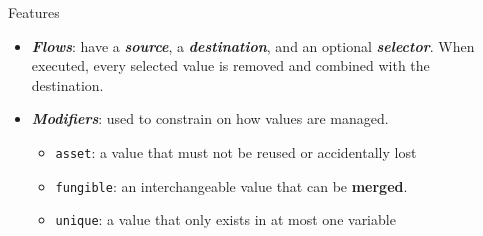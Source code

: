 \documentclass[usenames, dvipsnames, final]{beamer}
\newlength{\sepwidth}
\newlength{\colwidth}
\newcommand{\separatorcolumn}{\begin{column}{\sepwidth}\end{column}}
\newcommand{\term}[1]{\textbf{\emph{#1}}}
\begin{document}
\begin{frame}[t]
\begin{columns}[t]
\separatorcolumn

\begin{column}{\colwidth}
    \begin{alertblock}{Features}
        \begin{itemize}
            \item \term{Flows}: have a \term{source}, a \term{destination}, and an optional \term{selector}.
                When executed, every selected value is removed and combined with the destination.

            \item \term{Modifiers}: used to constrain on how values are managed. %
                \begin{itemize}
                    \item \lstinline[language=flow,basicstyle=\normalsize\ttfamily]{asset}: a value that must not be reused or accidentally lost
                    \item \lstinline[language=flow,basicstyle=\normalsize\ttfamily]{fungible}: an interchangeable value that can be \textbf{merged}. %
                    \item \lstinline[language=flow,basicstyle=\normalsize\ttfamily]{unique}: a value that only exists in at most one variable %
                \end{itemize}


\end{itemize}
\end{alertblock}
\end{column}
\end{columns}
\end{frame}
\end{document}
